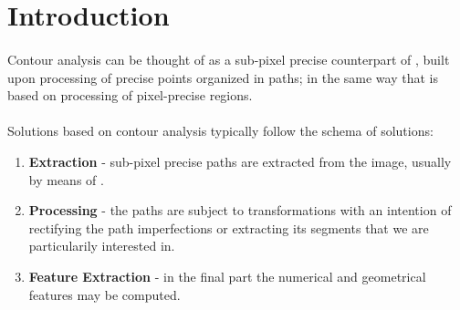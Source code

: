 \section{Introduction}

\paragraph*{}
Contour analysis can be thought of as a sub-pixel precise counterpart of , built upon processing of precise points organized in paths; in the same way that  is based on processing of pixel-precise regions.

\paragraph*{}
Solutions based on contour analysis typically follow the schema of  solutions:

\begin{enumerate}
	\item \textbf{Extraction} - sub-pixel precise paths are extracted from the image, usually by means of .
	\item \textbf{Processing} - the paths are subject to transformations with an intention of rectifying the path imperfections or extracting its segments that we are particularily interested in.
	\item \textbf{Feature Extraction} - in the final part the numerical and geometrical features may be computed.
\end{enumerate}